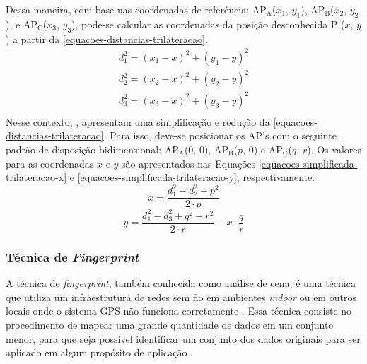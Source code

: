 \documentclass[12pt]{artigoifce}
\begin{document}
Dessa maneira, com base nas coordenadas de referência: AP$_\text{A}$($x_1$,  $y_1$), AP$_\text{B}$($x_2$, $y_2$), e AP$_\text{C}$($x_3$, $y_3$), pode-se calcular as coordenadas da posição desconhecida P ($x$, $y$) a partir da  \autoref{equacoes-distancias-trilateracao}.
\begin{equation}
    \label{equacoes-distancias-trilateracao}
    \begin{split}
        d_1^2 = (x_1 - x)^2 + (y_1 - y)^2 \\
        d_2^2 = (x_2 - x)^2 + (y_2 - y)^2 \\
        d_3^2 = (x_3 - x)^2 + (y_3 - y)^2 \\
    \end{split}
\end{equation}
Nesse contexto, , apresentam uma simplificação e redução da \autoref{equacoes-distancias-trilateracao}. Para isso, deve-se posicionar os AP's com o seguinte padrão de disposição bidimensional: AP$_\text{A}$($0$, $0$), AP$_\text{B}$($p$,  $0$) e AP$_\text{C}$($q$, $r$). Os valores para as coordenadas $x$ e $y$ são apresentados nas Equações \ref{equacoes-simplificada-trilateracao-x} e \ref{equacoes-simplificada-trilateracao-y}, respectivamente. 
\begin{equation}
    \label{equacoes-simplificada-trilateracao-x}
    x = \frac{d_1^2-d_2^2+p^2}{2\cdot p}
\end{equation}
\begin{equation}
    \label{equacoes-simplificada-trilateracao-y}
    y = \frac{d_1^2-d_3^2+q^2+r^2}{2\cdot r} - x\cdot\frac{q}{r}
\end{equation}

\subsubsection{Técnica de \textit{Fingerprint}}
\label{sec-fundamentacao-fingerprint}

A técnica de \textit{fingerprint}, também conhecida como análise de cena, é uma técnica que utiliza um infraestrutura de redes sem fio em ambientes \textit{indoor} ou em outros locais onde o sistema GPS não funciona corretamente \cite{khalel2010}. Essa técnica consiste no procedimento de mapear uma grande quantidade de dados em um conjunto menor, para que seja possível identificar um conjunto dos dados originais para ser aplicado em algum propósito de aplicação \cite{barros2016}.
\end{document}
